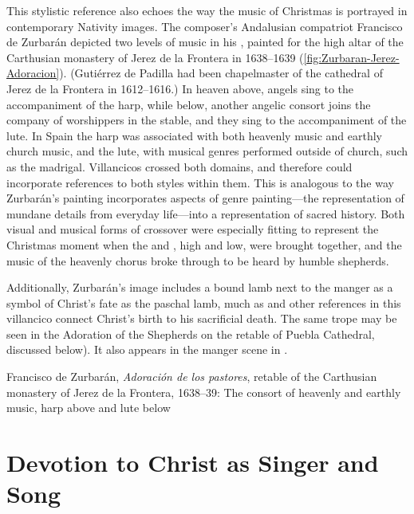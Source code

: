 This stylistic reference also echoes the way the music of Christmas is portrayed
in contemporary Nativity images.
The composer's Andalusian compatriot Francisco de Zurbarán depicted two levels
of music in his , painted for the high altar
of the Carthusian monastery of Jerez de la Frontera in 1638--1639
(\cref{fig:Zurbaran-Jerez-Adoracion}).
(Gutiérrez de Padilla had been chapelmaster of the cathedral of Jerez de la
Frontera in 1612--1616.)%
    \Autocite{Gembero:Padilla}
In heaven above, angels sing to the accompaniment of the harp, while below,
another angelic consort joins the company of worshippers in the stable, and they
sing to the accompaniment of the lute.
In Spain the harp was associated with both heavenly music and earthly church
music, and the lute, with musical genres performed outside of church, such as
the madrigal.
Villancicos crossed both domains, and therefore could incorporate references to
both styles within them.
This is analogous to the way Zurbarán's painting incorporates aspects of genre
painting---the representation of mundane details from everyday life---into a
representation of sacred history.%
    \Autocites
    [31]{Sanchez:Zurbaran}
    {Cherry:Bodegon}
    {Haraszti-Takacs:Genre}
Both visual and musical forms of crossover were especially fitting to represent
the Christmas moment when the  and , high and low,
were brought together, and the music of the heavenly chorus broke through to be
heard by humble shepherds.%
\begin{Footnote}
    Additionally, Zurbarán's image includes a bound lamb next to the manger as a
    symbol of Christ's fate as the paschal lamb, much as  and other references in this villancico connect Christ's birth
    to his sacrificial death.
    The same trope may be seen in the Adoration of the Shepherds on the retable
    of Puebla Cathedral, discussed below).
    It also appears in the manger scene in
    \autocite[168]{Catholic:Breviarium1631}.
\end{Footnote}

{Francisco de Zurbarán, \emph{Adoración de los pastores}, retable of the
Carthusian monastery of Jerez de la Frontera, 1638--39: The consort of heavenly
and earthly music, harp above and lute below}

\section{Devotion to Christ as Singer and Song}

